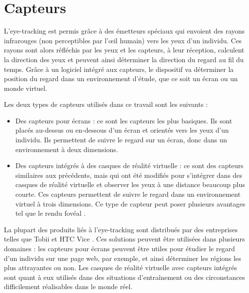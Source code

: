 \documentclass[hidelinks,12pt]{article}
\begin{document}

\section{Capteurs}

L'eye-tracking est permis grâce à des émetteurs spéciaux qui envoient des rayons
infrarouges (non perceptibles par l'œil humain) vers les yeux d'un individu.
Ces rayons sont alors réfléchis par les yeux et les capteurs, à leur réception,
calculent la direction des yeux et peuvent ainsi déterminer la direction du
regard au fil du temps. Grâce à un logiciel intégré aux capteurs, le dispositif
va déterminer la position du regard dans un environnement d'étude, que ce soit
un écran ou un monde virtuel.

\bigskip
Les deux types de capteurs utilisés dans ce travail sont les suivants :
\begin{itemize}
  \item Des capteurs pour écrans : ce sont les capteurs les plus basiques. Ils
        sont placés au-dessus ou en-dessous d'un écran et orientés vers les yeux
        d'un individu. Ils permettent de suivre le regard sur un écran, donc
        dans un environnement à deux dimensions.
  \item Des capteurs intégrés à des casques de réalité virtuelle : ce sont des
        capteurs similaires aux précédents, mais qui ont été modifiés pour
        s'intégrer dans des casques de réalité virtuelle et observer les yeux à
        une distance beaucoup plus courte. Ces capteurs permettent de suivre le
        regard dans un environnement virtuel à trois dimensions. Ce type de
        capteur peut poser plusieurs avantages tel que le rendu fovéal
        \cite{wiki_foveated_rendering}.
\end{itemize}

\bigskip
La plupart des produits liés à l'eye-tracking sont distribués par des
entreprises telles que Tobii \cite{tobii} et HTC Vice \cite{htc_vive_pro_eye}.
Ces solutions peuvent être utilisées dans plusieurs domaines \cite{yt_tobii_vr}
: les capteurs pour écrans peuvent être utiles pour étudier le regard d'un
individu sur une page web, par exemple, et ainsi déterminer les régions les
plus attrayantes ou non. Les casques de réalité virtuelle avec capteurs
intégrés sont quant à eux utilisés dans des situations d'entraînement ou des
circonstances difficilement réalisables dans le monde réel.
\end{document}
